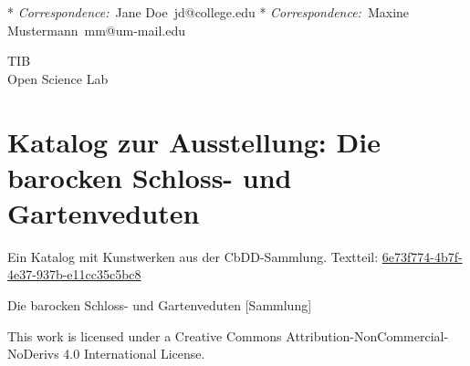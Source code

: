 \documentclass[
  11pt,
  a4paper,
  openany]{book}
\renewcommand*\contentsname{Table of contents}
\newcommand\contentsname{Table of contents}
\begin{document}
\begin{frontmatter}
\begin{titlepage}
\begin{tcolorbox}
  \vspace{1\baselineskip} 

  * \textit{Correspondence:}~Jane Doe~jd@college.edu\newline
  * \textit{Correspondence:}~Maxine Mustermann~mm@um-mail.edu\newline

  \end{tcolorbox}



  \vfill

  \vspace{1\baselineskip} 

  \begin{tcolorbox}
  \centering

  {
    TIB\\
    Open Science Lab
  }
  \end{tcolorbox}
  
  \end{titlepage}
  \end{frontmatter}

{\let\newpage\relax}
\renewcommand*\contentsname{Inhaltsverzeichnis}
{
\hypersetup{linkcolor=}
\setcounter{tocdepth}{2}
\tableofcontents
}
\mainmatter
{}

\chapter*{Katalog zur Ausstellung: Die barocken Schloss- und
Gartenveduten}\label{katalog-zur-ausstellung-die-barocken-schloss--und-gartenveduten}


Ein Katalog mit Kunstwerken aus der CbDD-Sammlung. Textteil:
\href{https://www.deckenmalerei.eu/42d06165-58e7-4653-bfe4-3d5f7091fc33\#6e73f774-4b7f-4e37-937b-e11cc35c5bc8}{6e73f774-4b7f-4e37-937b-e11cc35c5bc8}

Die barocken Schloss- und Gartenveduten {[}Sammlung{]}

This work is licensed under a Creative Commons
Attribution-NonCommercial-NoDerivs 4.0 International License.
\end{document}
